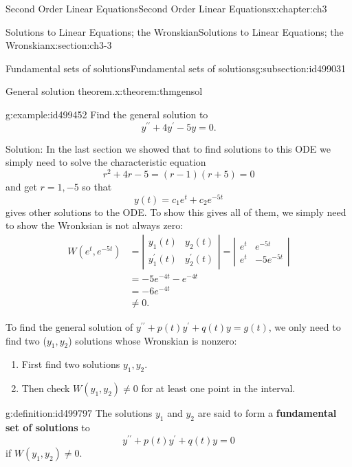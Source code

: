 \documentclass[oneside,10pt,]{book}
\newcommand{\terminology}[1]{\textbf{#1}}
\numberwithin{equation}{section}
\numberwithin{equation}{section}
\newcommand{\amp}{&}
\begin{document}
\begin{chapterptx}{Second Order Linear Equations}{}{Second Order Linear Equations}{}{}{x:chapter:ch3}
\begin{sectionptx}{Solutions to Linear Equations; the Wronskian}{}{Solutions to Linear Equations; the Wronskian}{}{}{x:section:ch3-3}
\begin{subsectionptx}{Fundamental sets of solutions}{}{Fundamental sets of solutions}{}{}{g:subsection:id499031}
\begin{theorem}{General solution theorem.}{}{x:theorem:thmgensol}
\end{theorem}
\begin{example}{}{g:example:id499452}%
Find the general solution to%
\begin{equation*}
y^{\prime\prime}+4y^{\prime}-5y=0.
\end{equation*}
%
\par
Solution: In the last section we showed that to find solutions to this ODE we simply need to solve the characteristic equation%
\begin{equation*}
r^{2}+4r-5=\left(r-1\right)\left(r+5\right)=0
\end{equation*}
and get \(r=1,-5\) so that%
\begin{equation*}
y(t)=c_{1}e^{t}+c_{2}e^{-5t}
\end{equation*}
gives other solutions to the ODE. To show this gives all of them, we simply need to show the Wronksian is not always zero:%
\begin{align*}
W\left(e^{t},e^{-5t}\right) \amp =\left|\begin{array}{cc}
y_{1}(t) \amp y_{2}(t)\\
y_{1}^{\prime}(t) \amp y_{2}^{\prime}(t)
\end{array}\right|=\left|\begin{array}{cc}
e^{t} \amp e^{-5t}\\
e^{t} \amp -5e^{-5t}
\end{array}\right|\\
\amp =-5e^{-4t}-e^{-4t}\\
\amp =-6e^{-4t}\\
\amp \neq0.
\end{align*}
%
\end{example}
To find the general solution of \(y^{\prime\prime}+p(t)y^{\prime}+q(t)y=g(t)\), we only need to find two (\(y_{1},y_{2}\)) solutions whose Wronskian is nonzero:%
\begin{enumerate}
\item{}First find two solutions \(y_{1},y_{2}\).%
\item{}Then check \(W(y_{1},y_{2})\neq0\) for at least one point in the interval.%
\end{enumerate}
%
\begin{definition}{}{g:definition:id499797}%
The solutions \(y_{1}\) and \(y_{2}\) are said to form a \terminology{fundamental set of solutions} to%
\begin{equation*}
y^{\prime\prime}+p(t)y^{\prime}+q(t)y=0
\end{equation*}
if \(W\left(y_{1},y_{2}\right)\neq0\).%

\end{definition}
\end{subsectionptx}
\end{sectionptx}
\end{chapterptx}
\end{document}

